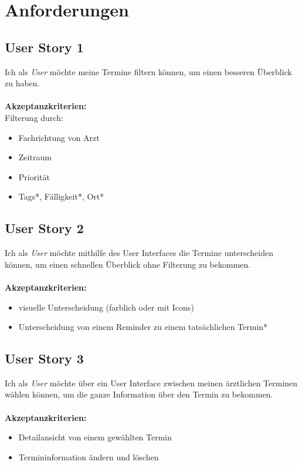 \documentclass[conference]{IEEEtran}
\begin{document}
\section{Anforderungen}
\subsection{User Story 1}
Ich als \textit{User} möchte meine Termine filtern können, um einen besseren Überblick zu haben.\\\\
\textbf{Akzeptanzkriterien:}\\
Filterung durch:
\begin{itemize}
	\item Fachrichtung von Arzt
	\item Zeitraum
	\item Priorität
	\item Tags*, Fälligkeit*, Ort* 
\end{itemize}

\subsection{User Story 2}
Ich als \textit{User} möchte mithilfe des User Interfaces die Termine unterscheiden können, um einen schnellen Überblick ohne Filterung zu bekommen.\\\\
\textbf{Akzeptanzkriterien:}
\begin{itemize}
	\item visuelle Unterscheidung (farblich oder mit Icons)
	\item Unterscheidung von einem Reminder zu einem tatsächlichen Termin*
\end{itemize}

\subsection{User Story 3}
Ich als \textit{User} möchte über ein User Interface zwischen meinen ärztlichen Terminen wählen können, um die ganze Information über den Termin zu bekommen.\\\\
\textbf{Akzeptanzkriterien:}
\begin{itemize}
	\item Detailansicht von einem gewählten Termin
	\item Termininformation ändern und löschen
\end{itemize}
\end{document}
